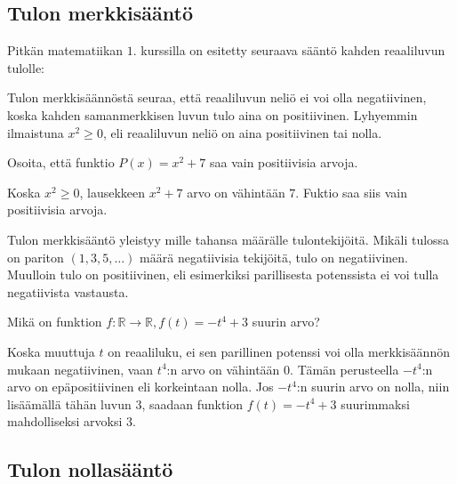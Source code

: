 \subsection*{Tulon merkkisääntö}

Pitkän matematiikan $1$. kurssilla on esitetty seuraava sääntö kahden reaaliluvun tulolle:


Tulon merkkisäännöstä seuraa, että reaaliluvun neliö ei voi olla negatiivinen, koska kahden samanmerkkisen luvun tulo aina on positiivinen. Lyhyemmin ilmaistuna $x^2 \geq 0$, eli reaaliluvun neliö on aina  positiivinen tai nolla.

\begin{esimerkki}
Osoita, että funktio $P(x)=x^2+7$ saa vain positiivisia arvoja.
    \begin{esimratk}
	Koska $x^2 \geq 0$, lausekkeen $x^2+7$ arvo on vähintään $7$. Fuktio saa siis
	vain positiivisia arvoja.
    \end{esimratk}
\end{esimerkki}

Tulon merkkisääntö yleistyy mille tahansa määrälle tulontekijöitä. Mikäli tulossa on pariton $(1, 3, 5, \ldots)$ määrä negatiivisia tekijöitä, tulo on negatiivinen. Muulloin tulo on positiivinen, eli esimerkiksi parillisesta potenssista ei voi tulla negatiivista vastausta.

\newpage %
\begin{esimerkki}
Mikä on funktion $f:\mathbb{R} \rightarrow \mathbb{R}, f(t)=-t^4+3$ suurin arvo?
    \begin{esimratk}
Koska muuttuja $t$ on reaaliluku, ei sen parillinen potenssi voi olla merkkisäännön mukaan negatiivinen, vaan $t^4$:n arvo on vähintään $0$. Tämän perusteella $-t^4$:n arvo on epäpositiivinen eli korkeintaan nolla. Jos $-t^4$:n suurin arvo on nolla, niin lisäämällä tähän luvun $3$, saadaan funktion $f(t)=-t^4+3$ suurimmaksi mahdolliseksi arvoksi $3$.
    \end{esimratk}
\end{esimerkki}

\subsection*{Tulon nollasääntö}

